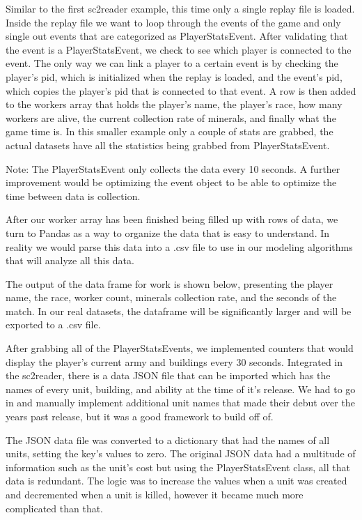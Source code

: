 \documentclass[a4paper,12pt]{report}
\begin{document}
Similar to the first sc2reader example, this time only a single replay file is loaded. Inside the replay file we want to loop through the events of the game and only single out events that are categorized as PlayerStatsEvent. After validating that the event is a PlayerStatsEvent, we check to see which player is connected to the event. The only way we can link a player to a certain event is by checking the player’s pid, which is initialized when the replay is loaded, and the event’s pid, which copies the player’s pid that is connected to that event. A row is then added to the workers array that holds the player’s name, the player’s race, how many workers are alive, the current collection rate of minerals, and finally what the game time is. In this smaller example only a couple of stats are grabbed, the actual datasets have all the statistics being grabbed from PlayerStatsEvent.

Note: The PlayerStatsEvent only collects the data every 10 seconds. A further improvement would be optimizing the event object to be able to optimize the time between data is collection.

After our worker array has been finished being filled up with rows of data, we turn to Pandas as a way to organize the data that is easy to understand. In reality we would parse this data into a .csv file to use in our modeling algorithms that will analyze all this data.

The output of the data frame for work is shown below, presenting the player name, the race, worker count, minerals collection rate, and the seconds of the match. In our real datasets, the dataframe will be significantly larger and will be exported to a .csv file. 

After grabbing all of the PlayerStatsEvents, we implemented counters that would display the player’s current army and buildings every 30 seconds. Integrated in the sc2reader, there is a data JSON file that can be imported which has the names of every unit, building, and ability at the time of it’s release. We had to go in and manually implement additional unit names that made their debut over the years past release, but it was a good framework to build off of. 


The JSON data file was converted to a dictionary that had the names of all units, setting the key’s values to zero. The original JSON data had a multitude of information such as the unit’s cost but using the PlayerStatsEvent class, all that data is redundant. The logic was to increase the values when a unit was created and decremented when a unit is killed, however it became much more complicated than that. 
\end{document}
